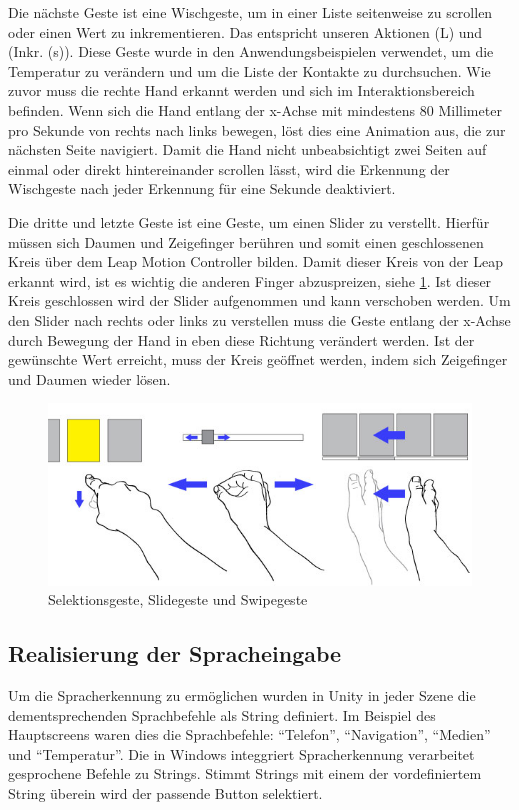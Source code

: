 Die nächste Geste ist eine Wischgeste, um in einer Liste seitenweise zu scrollen oder einen Wert zu inkrementieren.
Das entspricht unseren Aktionen (L) und (Inkr. (s)). 
Diese Geste wurde in den Anwendungsbeispielen verwendet, um die Temperatur zu verändern und um die Liste der Kontakte zu durchsuchen. 
Wie zuvor muss die rechte Hand erkannt werden und sich im Interaktionsbereich befinden. 
Wenn sich die Hand entlang der x-Achse mit mindestens 80 Millimeter pro Sekunde von rechts nach links bewegen, löst dies eine Animation aus, die zur nächsten Seite navigiert. 
Damit die Hand nicht unbeabsichtigt zwei Seiten auf einmal oder direkt hintereinander scrollen lässt, wird die Erkennung der Wischgeste nach jeder Erkennung für eine Sekunde deaktiviert. 

Die dritte und letzte Geste ist eine Geste, um einen Slider zu verstellt. 
Hierfür müssen sich Daumen und Zeigefinger berühren und somit einen geschlossenen Kreis über dem Leap Motion Controller bilden.
Damit dieser Kreis von der Leap erkannt wird, ist es wichtig die anderen Finger abzuspreizen, siehe \ref{fig:Gestures}. 
Ist dieser Kreis geschlossen wird der Slider aufgenommen und kann verschoben werden. 
Um den Slider nach rechts oder links zu verstellen muss die Geste entlang der x-Achse durch Bewegung der Hand in eben diese Richtung verändert werden. 
Ist der gewünschte Wert erreicht, muss der Kreis geöffnet werden, indem sich Zeigefinger und Daumen wieder lösen. 
\begin{figure}
	\centering
		\includegraphics[width=1\textwidth]{img/Gestures-mit_Pfeile.jpg}
	\caption{Selektionsgeste, Slidegeste und Swipegeste}
	\label{fig:Gestures}
\end{figure}

\subsection[Sprache]{Realisierung der Spracheingabe}
Um die Spracherkennung zu ermöglichen wurden in Unity in jeder Szene die dementsprechenden Sprachbefehle als String definiert. 
Im Beispiel des Hauptscreens waren dies die Sprachbefehle: "`Telefon"', "`Navigation"', "`Medien"' und "`Temperatur"'. 
Die in Windows integgriert Spracherkennung verarbeitet gesprochene Befehle zu Strings.
Stimmt Strings mit einem der vordefiniertem String überein wird der passende Button selektiert. 

